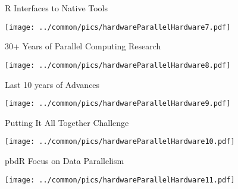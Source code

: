 \begin{frame}
\begin{block}{R Interfaces to Native Tools}
    
\texttt{[image: 
../common/pics/hardwareParallelHardware7.pdf]}
\end{block}
\end{frame}

\begin{frame}
\begin{block}{30+ Years of Parallel Computing Research}
    
\texttt{[image: 
../common/pics/hardwareParallelHardware8.pdf]}
\end{block}
\end{frame}

\begin{frame}
\begin{block}{Last 10 years of Advances}
    
\texttt{[image: 
../common/pics/hardwareParallelHardware9.pdf]}
\end{block}
\end{frame}

\begin{frame}
\begin{block}{Putting It All Together Challenge}
    
\texttt{[image: 
../common/pics/hardwareParallelHardware10.pdf]}
\end{block}
\end{frame}

\begin{frame}
\begin{block}{pbdR Focus on Data Parallelism}
    
\texttt{[image: 
../common/pics/hardwareParallelHardware11.pdf]}
\end{block}
\end{frame}
